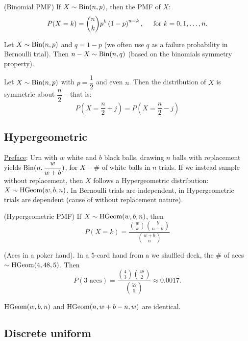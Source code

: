 \begin{theorema}{(Binomial PMF)}{}
    If $X \sim \operatorname{Bin}(n,p)$, then the PMF of $X$:
    \[
        P(X = k) = \binom{n}{k} p^k \left(1 - p\right)^{n-k}, \hspace*{0.5cm} \text{for } k = 0,1, \ldots, n.  
    \] 
\end{theorema}
\begin{theorema}{}{}
    Let $X \sim \operatorname{Bin}(n, p)$ and $q = 1-p$ (we often use $q$ as a failure probability in Bernoulli trial). Then $n-X \sim \operatorname{Bin}(n, q)$ (based on the binomials symmetry property).
\end{theorema}
\par 
\cons Let $X \sim \operatorname{Bin}(n,p)$ with $p = \dfrac{1}{2}$ and even $n$. Then the distribution of $X$ is symmetric about $\dfrac{n}{2}$ -- that is:
\[
    P (X = \dfrac{n}{2} + j) = P(X=\dfrac{n}{2} - j)    
\]

\subsection*{Hypergeometric}

\par
\underline{Preface}: Urn with $w$ white and $b$ black balls, drawing $n$ balls with replacement yields $\operatorname{Bin}(n, \dfrac{w}{w+b})$, for $X - \#$ of white balls in $n$ trials. If we instead sample without replacement, then $X$ follows a Hypergeometric distribution: $X \sim \operatorname{HGeom}(w, b, n)$. In Bernoulli trials are independent, in Hypergeometric trials are dependent (cause of without replacement nature).
\begin{theorema}{(Hypergeometric PMF)}{}
    If $X \sim \operatorname{HGeom}(w, b, n)$, then 
    \[
        P (X = k)  = \dfrac{\displaystyle \binom{\displaystyle w}{\displaystyle k} \binom{b}{n-k}}{\displaystyle \binom{w+b}{n}}
    \]  
\end{theorema}
\example (Aces in a poker hand). In a 5-card hand from a we shuffled deck, the $\#$ of aces $\sim \operatorname{HGeom}(4, 48, 5)$. Then 
\[
    P(3\text{ aces}) = \dfrac{\displaystyle \binom{4}{3} \binom{48}{2}}{\displaystyle \binom{52}{5}} \approx 0.0017.  
\]
\begin{theorema}{}{}
    $\operatorname{HGeom}(w, b, n)$ and $\operatorname{HGeom}(n, w+b - n, w)$ are identical.
\end{theorema}

\subsection*{Discrete uniform}

